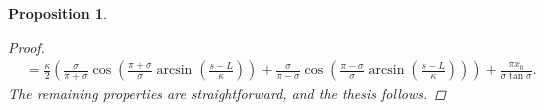 \documentclass[11pt]{amsart}
\newcommand{\rr}{{\mathbb{R}}}
\renewcommand{\k}{\kappa}
\newtheorem{proposition}[theorem]{Proposition}
\theoremstyle{definition}
\theoremstyle{remark}
\numberwithin{equation}{section}
\begin{document}
\begin{proposition}
\begin{proof}
\begin{equation*}
\begin{split}
			&=\frac{\k}{2}\left(\frac{\sigma}{\pi+\sigma}\cos\left(\frac{\pi+\sigma}{\sigma}\arcsin\left(\frac{s-L}{\k}\right)\right)+\frac{\sigma}{\pi-\sigma}\cos\left(\frac{\pi-\sigma}{\sigma}\arcsin\left(\frac{s-L}{\k}\right)\right)\right)+\frac{\pi x_0}{\sigma\tan\sigma}.
		\end{split}
	\end{equation*}
	The remaining properties are straightforward, and the thesis follows.
\end{proof}
\end{proposition}
\end{document}
